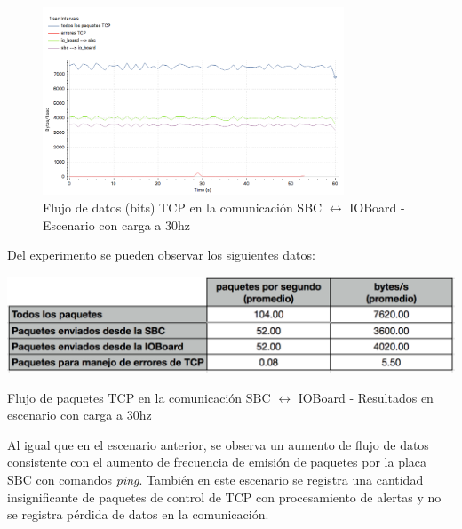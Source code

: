 \documentclass[withindex,glossary]{cam-thesis}
\begin{document}
\begin{figure}[H]
  \centering
  	\includegraphics[width=0.8\textwidth]{images/TCP_Throughput_io_to_pc_30hz_bps}
  	\caption[Throughput de la conexión TCP - Escenario con carga a 30hz]{Flujo de datos (bits) TCP en la comunicación SBC $\leftrightarrow$ IOBoard -  Escenario con carga a 30hz}
  \label{fig:TCP_Throughput_io_to_pc_30hz_bps}
\end{figure}
Del experimento se pueden observar los siguientes datos:
\begin{table}[H]
	\centering
 	\begin{minipage}[b]{0.6\textwidth}  	
  		\includegraphics[width=\textwidth]{images/TCP_Throughput_io_to_pc_30hz_results}
  		\caption[Throughput de la conexión TCP - Básico]{Flujo de paquetes TCP en la comunicación SBC $\leftrightarrow$ IOBoard -  Resultados en escenario con carga a 30hz}
		\label{fig:TCP_Throughput_io_to_pc_30hz_results}
	\end{minipage}
\end{table}
Al igual que en el escenario anterior, se observa un aumento de flujo de datos consistente con el aumento de frecuencia de emisión de paquetes por la placa SBC con comandos \textit{ping}. 
También en este escenario se registra una cantidad insignificante de paquetes de control de TCP con procesamiento de alertas y no se registra pérdida de datos en la comunicación.
\end{document}
